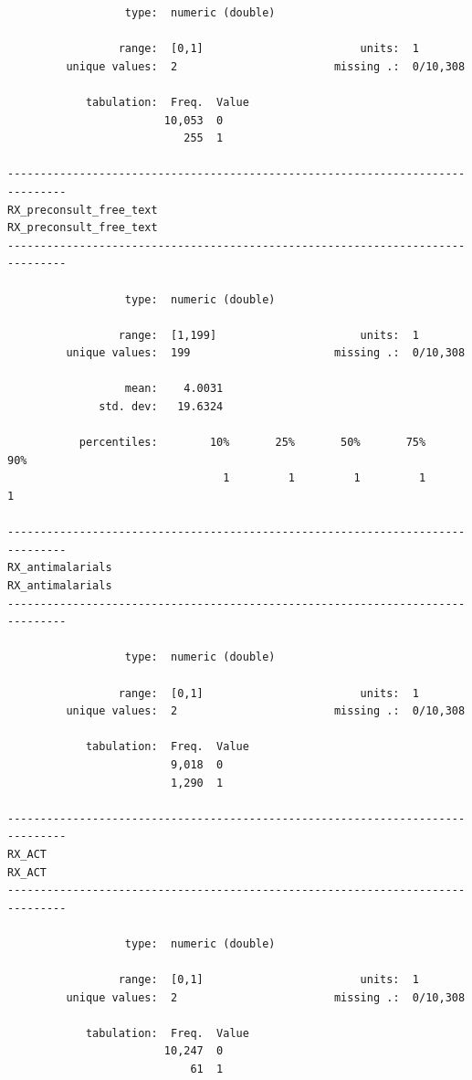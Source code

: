 \documentclass[
  letterpaper,
  DIV=11,
  numbers=noendperiod]{scrreprt}
\begin{document}
\begin{verbatim}
                  type:  numeric (double)

                 range:  [0,1]                        units:  1
         unique values:  2                        missing .:  0/10,308

            tabulation:  Freq.  Value
                        10,053  0
                           255  1

-------------------------------------------------------------------------------
RX_preconsult_free_text                                 RX_preconsult_free_text
-------------------------------------------------------------------------------

                  type:  numeric (double)

                 range:  [1,199]                      units:  1
         unique values:  199                      missing .:  0/10,308

                  mean:    4.0031
              std. dev:   19.6324

           percentiles:        10%       25%       50%       75%       90%
                                 1         1         1         1         1

-------------------------------------------------------------------------------
RX_antimalarials                                               RX_antimalarials
-------------------------------------------------------------------------------

                  type:  numeric (double)

                 range:  [0,1]                        units:  1
         unique values:  2                        missing .:  0/10,308

            tabulation:  Freq.  Value
                         9,018  0
                         1,290  1

-------------------------------------------------------------------------------
RX_ACT                                                                   RX_ACT
-------------------------------------------------------------------------------

                  type:  numeric (double)

                 range:  [0,1]                        units:  1
         unique values:  2                        missing .:  0/10,308

            tabulation:  Freq.  Value
                        10,247  0
                            61  1


\end{verbatim}
\end{document}
